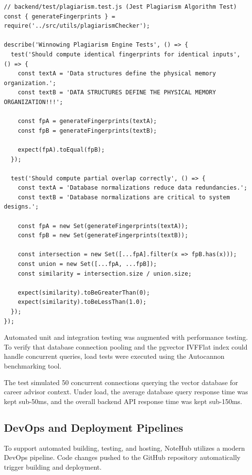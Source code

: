 \documentclass[12,Times new Roman,a4paper]{report}
\begin{document}
\begin{verbatim}
// backend/test/plagiarism.test.js (Jest Plagiarism Algorithm Test)
const { generateFingerprints } = require('../src/utils/plagiarismChecker');

describe('Winnowing Plagiarism Engine Tests', () => {
  test('Should compute identical fingerprints for identical inputs', () => {
    const textA = 'Data structures define the physical memory organization.';
    const textB = 'DATA STRUCTURES DEFINE THE PHYSICAL MEMORY ORGANIZATION!!!';

    const fpA = generateFingerprints(textA);
    const fpB = generateFingerprints(textB);

    expect(fpA).toEqual(fpB);
  });

  test('Should compute partial overlap correctly', () => {
    const textA = 'Database normalizations reduce data redundancies.';
    const textB = 'Database normalizations are critical to system designs.';

    const fpA = new Set(generateFingerprints(textA));
    const fpB = new Set(generateFingerprints(textB));

    const intersection = new Set([...fpA].filter(x => fpB.has(x)));
    const union = new Set([...fpA, ...fpB]);
    const similarity = intersection.size / union.size;

    expect(similarity).toBeGreaterThan(0);
    expect(similarity).toBeLessThan(1.0);
  });
});
\end{verbatim}
\label{lst:jest_test}

Automated unit and integration testing was augmented with performance testing. To verify that database connection pooling and the pgvector IVFFlat index could handle concurrent queries, load tests were executed using the Autocannon benchmarking tool. 

The test simulated 50 concurrent connections querying the vector database for career advisor context. Under load, the average database query response time was kept sub-50ms, and the overall backend API response time was kept sub-150ms.

\subsection{DevOps and Deployment Pipelines}

To support automated building, testing, and hosting, NoteHub utilizes a modern DevOps pipeline. Code changes pushed to the GitHub repository automatically trigger building and deployment.
\end{document}
